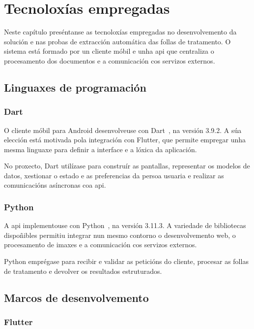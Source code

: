 \chapter{Tecnoloxías empregadas}
\label{chap:tecnoloxias}

Neste capítulo preséntanse as tecnoloxías empregadas no desenvolvemento da solución e nas probas de extracción automática das follas de tratamento. O sistema está formado por un cliente móbil e unha \gls{api} que centraliza o procesamento dos documentos e a comunicación cos servizos externos.

\section{Linguaxes de programación}

\subsection{Dart}

O cliente móbil para Android desenvolveuse con Dart~\cite{DartDocs}, na versión 3.9.2. A súa elección está motivada pola integración con Flutter, que permite empregar unha mesma linguaxe para definir a interface e a lóxica da aplicación.

No proxecto, Dart utilízase para construír as pantallas, representar os modelos de datos, xestionar o estado e as preferencias da persoa usuaria e realizar as comunicacións asíncronas coa \gls{api}.

\subsection{Python}

A \gls{api} implementouse con Python~\cite{PythonDocs}, na versión 3.11.3. A variedade de bibliotecas dispoñibles permitiu integrar nun mesmo contorno o desenvolvemento web, o procesamento de imaxes e a comunicación cos servizos externos.

Python emprégase para recibir e validar as peticións do cliente, procesar as follas de tratamento e devolver os resultados estruturados.

\section{Marcos de desenvolvemento}

\subsection{Flutter}

